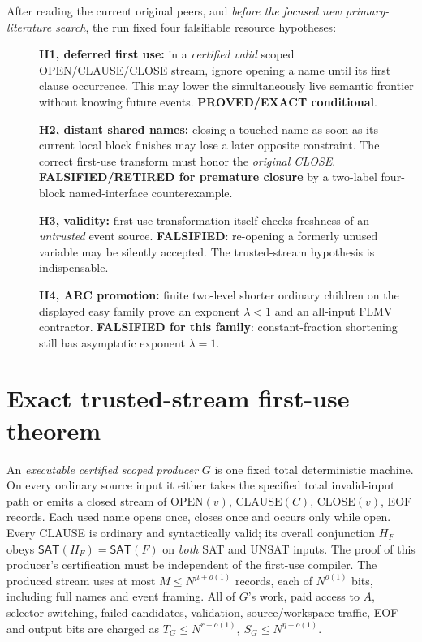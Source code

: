 \documentclass[11pt]{article}
\newcommand{\SAT}{\mathsf{SAT}}
\begin{document}
After reading the current original peers, and \emph{before the focused new
primary-literature search}, the run fixed four falsifiable resource hypotheses:
\begin{description}
\item[] \textbf{H1, deferred first use:} in a \emph{certified valid} scoped
OPEN/CLAUSE/CLOSE stream, ignore opening a name until its first
clause occurrence. This may lower the simultaneously live semantic
frontier without knowing future events. \textbf{PROVED/EXACT conditional}.
\item[] \textbf{H2, distant shared names:} closing a touched name as soon as
its current local block finishes may lose a later opposite constraint.
The correct first-use transform must honor the \emph{original CLOSE}.
\textbf{FALSIFIED/RETIRED for premature closure} by a two-label
four-block named-interface counterexample.
\item[] \textbf{H3, validity:} first-use transformation itself checks
freshness of an \emph{untrusted} event source.
\textbf{FALSIFIED}: re-opening a formerly unused variable may be silently
accepted. The trusted-stream hypothesis is indispensable.
\item[] \textbf{H4, ARC promotion:} finite two-level shorter ordinary
children on the displayed easy family prove an exponent
$\lambda<1$ and an all-input FLMV contractor.
\textbf{FALSIFIED for this family}: constant-fraction shortening
still has asymptotic exponent $\lambda=1$.
\end{description}

\section{Exact trusted-stream first-use theorem}
An \emph{executable certified scoped producer} $G$ is one fixed total
deterministic machine. On every ordinary source input it either takes the
specified total invalid-input path or emits a closed stream of
$\mathrm{OPEN}(v)$, $\mathrm{CLAUSE}(C)$, $\mathrm{CLOSE}(v)$, EOF records.
Each used name opens once, closes once and occurs only while open.
Every CLAUSE is ordinary and syntactically valid; its overall conjunction
$H_F$ obeys $\SAT(H_F)=\SAT(F)$ on \emph{both} SAT and UNSAT inputs.
The proof of this producer's certification must be independent of
the first-use compiler. The produced stream uses at most
$M\le N^{\mu+o(1)}$ records, each of $N^{o(1)}$ bits, including
full names and event framing. All of $G$'s work, paid access to $A$,
selector switching, failed candidates, validation, source/workspace
traffic, EOF and output bits are charged as
$T_G\le N^{r+o(1)},\ S_G\le N^{\eta+o(1)}$.
\end{document}
